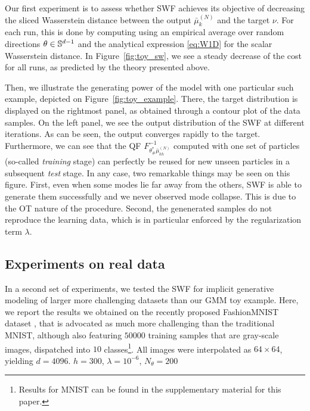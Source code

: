 Our first experiment is to assess whether SWF achieves its objective of decreasing the sliced Wasserstein distance between the output $\bar{\mu}_{k}^{(N)}$ and the target $\nu$. For each run, this is done by computing \label{eqn:sw} using an empirical average over random directions $\theta\in\mathbb{S}^{d-1}$ and the analytical expression \eqref{eq:W1D} for the scalar Wasserstein distance. In Figure~\ref{fig:toy_sw}, we see a steady decrease of the cost for all runs, as predicted by the theory presented above.

Then, we illustrate the generating power of the model with one particular such example, depicted on Figure~\ref{fig:toy_example}. There, the target distribution is displayed on the rightmost panel, as obtained through a contour plot of the data samples. On the left panel, we see the output distribution of the SWF at different iterations. As can be seen, the output converges rapidly to the target. Furthermore, we can see that the QF $F^{-1}_{\theta^*_\#\bar{\mu}_{kh}^{(N)}}$ computed with one set of particles (so-called \textit{training} stage) can perfectly be reused for new unseen particles in a subsequent \textit{test} stage. In any case, two remarkable things may be seen on this figure. First, even when some modes lie far away from the others, SWF is able to generate them successfully and we never observed mode collapse. This is due to the OT nature of the procedure. Second, the genenerated samples do not reproduce the learning data, which is in particular enforced by the regularization term $\lambda$.

\subsection{Experiments on real data}
\label{sub:real_data}

In a second set of experiments, we tested the SWF for implicit generative modeling of larger more challenging datasets than our GMM toy example. Here, we report the results we obtained on the recently proposed FashionMNIST dataset \cite{xiao2017fashion}, that is advocated as much more challenging than the traditional MNIST, although also featuring $50000$ training samples that are gray-scale images, dispatched into $10$ classes\footnote{Results for MNIST can be found in the supplementary material for this paper.}. All images were interpolated as $64\times 64$, yielding $d=4096$. $h=300$, $\lambda=10^{-6}$, $N_\theta=200$

